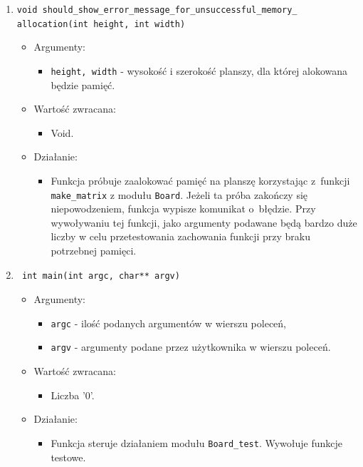 \documentclass[a4paper,11pt, notitlepage ]{article}
\begin{document}
\begin{enumerate}
\item \verb+void should_show_error_message_for_unsuccessful_memory_+ \\\verb+allocation(int height, int width)+
\begin{itemize}
\item Argumenty:
\begin{itemize}
\item \verb+height, width+ - wysokość i szerokość planszy, dla której alokowana będzie pamięć. 
\end{itemize}
\item Wartość zwracana:
\begin{itemize}
\item Void.
\end{itemize}
\item Działanie:
\begin{itemize}
\item Funkcja próbuje zaalokować pamięć na planszę korzystając z~funkcji \verb+make_matrix+ z modułu \verb+Board+. Jeżeli ta próba zakończy się niepowodzeniem, funkcja wypisze komunikat o~błędzie. Przy wywoływaniu tej funkcji, jako 
argumenty podawane będą bardzo duże liczby w celu przetestowania zachowania funkcji przy braku potrzebnej pamięci. 
\end{itemize}
\end{itemize}


\item \begin{verbatim} int main(int argc, char** argv) \end{verbatim}
\begin{itemize}
\item Argumenty:
\begin{itemize}
\item \verb+argc+ - ilość podanych argumentów w wierszu poleceń,
\item \verb+argv+ - argumenty podane przez użytkownika w wierszu poleceń.
\end{itemize}
\item Wartość zwracana:
\begin{itemize}
\item Liczba '0'.
\end{itemize}
\item Działanie:
\begin{itemize}
\item Funkcja steruje działaniem modułu \verb+Board_test+. Wywołuje funkcje testowe.
\end{itemize}
\end{itemize}


\end{enumerate}
\end{document}
